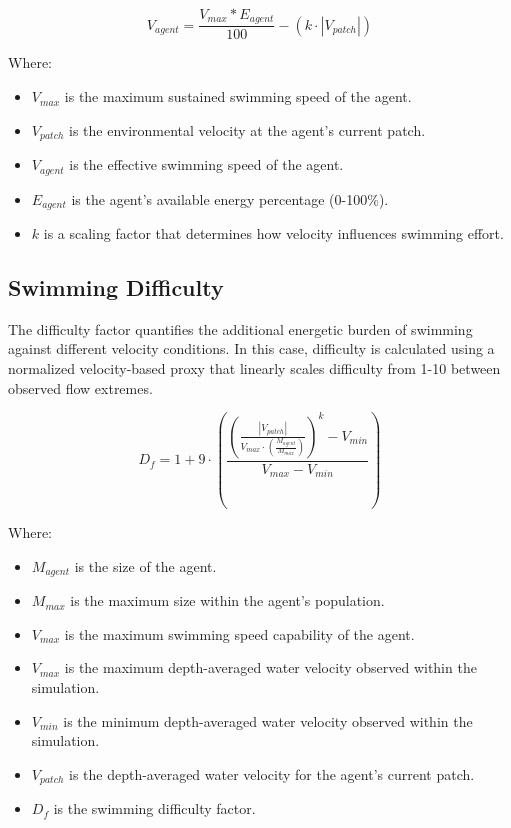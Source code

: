 \documentclass[
]{book}
\providecommand{\tightlist}{%
  \setlength{\itemsep}{0pt}\setlength{\parskip}{0pt}}
\begin{document}
\[ V_{agent} = \frac{V_{max} * E_{agent}}{100} - (k \cdot |V_{patch}|) \]

Where:

\begin{itemize}
\item
  \(V_{max}\) is the maximum sustained swimming speed of the agent.
\item
  \(V_{patch}\) is the environmental velocity at the agent's current patch.
\item
  \(V_{agent}\) is the effective swimming speed of the agent.
\item
  \(E_{agent}\) is the agent's available energy percentage (0-100\%).
\item
  \(k\) is a scaling factor that determines how velocity influences swimming effort.
\end{itemize}

\subsection{\texorpdfstring{\textbf{Swimming Difficulty}}{Swimming Difficulty}}\label{swimming-difficulty-1}

The difficulty factor quantifies the additional energetic burden of swimming against different velocity conditions. In this case, difficulty is calculated using a normalized velocity-based proxy that linearly scales difficulty from 1-10 between observed flow extremes.

\[D_{f} = 1 + 9 \cdot \left(\frac{\left( \frac{|V_{patch}|}{V_{max} \cdot \left(\frac{M_{agent}}{M_{max}}\right)} \right)^k - V_{min}}{V_{max} - V_{min}}\right)\]

Where:

\begin{itemize}
\tightlist
\item
  \(M_{agent}\) is the size of the agent.
\item
  \(M_{max}\) is the maximum size within the agent's population.
\item
  \(V_{max}\) is the maximum swimming speed capability of the agent.
\item
  \(V_{max}\) is the maximum depth-averaged water velocity observed within the simulation.
\item
  \(V_{min}\) is the minimum depth-averaged water velocity observed within the simulation.
\item
  \(V_{patch}\) is the depth-averaged water velocity for the agent's current patch.
\item
  \(D_{f}\) is the swimming difficulty factor.
\end{itemize}
\end{document}

